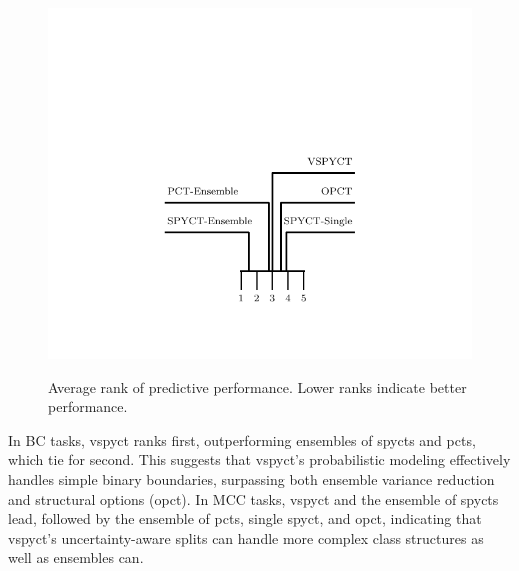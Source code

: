 \documentclass[3p,review,authoryear]{elsarticle}
\begin{document}
\begin{figure}[h!]
{        \includegraphics{critical_distance_str.pdf}
        \label{fig:subfig3}
    }
    \caption{Average rank of predictive performance. Lower ranks indicate better performance.}
    \label{fig:avg_rank}
\end{figure}

In BC tasks, \gls{vspyct} ranks first, outperforming ensembles of \glspl{spyct} and \glspl{pct}, which tie for second. This suggests that \gls{vspyct}’s probabilistic modeling effectively handles simple binary boundaries, surpassing both ensemble variance reduction and structural options (\gls{opct}).
In MCC tasks, \gls{vspyct} and the ensemble of \glspl{spyct} lead, followed by the ensemble of \glspl{pct}, single \gls{spyct}, and \gls{opct}, indicating that \gls{vspyct}’s uncertainty-aware splits can handle more complex class structures as well as ensembles can.
\end{document}
